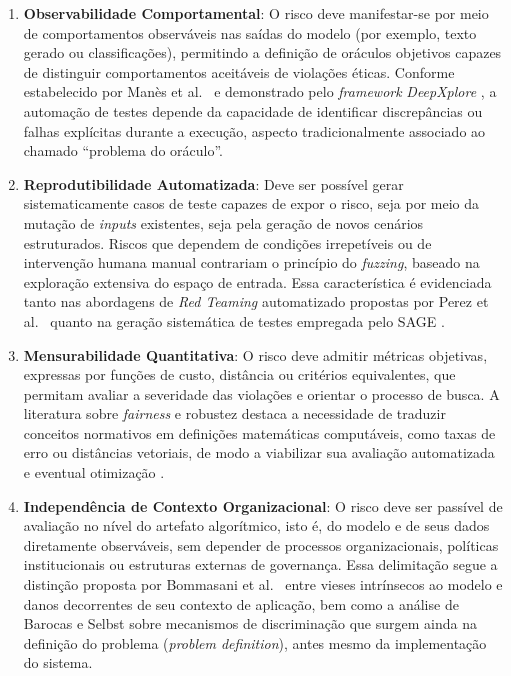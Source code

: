 \begin{enumerate}
    \item \textbf{Observabilidade Comportamental}: O risco deve manifestar-se por meio de comportamentos observáveis nas saídas do modelo (por exemplo, texto gerado ou classificações), permitindo a definição de oráculos objetivos capazes de distinguir comportamentos aceitáveis de violações éticas. Conforme estabelecido por Manès et al.~\cite{Manes2021} e demonstrado pelo \textit{framework} \textit{DeepXplore} \cite{Pei2017}, a automação de testes depende da capacidade de identificar discrepâncias ou falhas explícitas durante a execução, aspecto tradicionalmente associado ao chamado ``problema do oráculo''.

    \item \textbf{Reprodutibilidade Automatizada}: Deve ser possível gerar sistematicamente casos de teste capazes de expor o risco, seja por meio da mutação de \textit{inputs} existentes, seja pela geração de novos cenários estruturados. Riscos que dependem de condições irrepetíveis ou de intervenção humana manual contrariam o princípio do \textit{fuzzing}, baseado na exploração extensiva do espaço de entrada. Essa característica é evidenciada tanto nas abordagens de \textit{Red Teaming} automatizado propostas por Perez et al.~\cite{Perez2022} quanto na geração sistemática de testes empregada pelo SAGE \cite{Godefroid2008}.

    \item \textbf{Mensurabilidade Quantitativa}: O risco deve admitir métricas objetivas, expressas por funções de custo, distância ou critérios equivalentes, que permitam avaliar a severidade das violações e orientar o processo de busca. A literatura sobre \textit{fairness} e robustez destaca a necessidade de traduzir conceitos normativos em definições matemáticas computáveis, como taxas de erro ou distâncias vetoriais, de modo a viabilizar sua avaliação automatizada e eventual otimização \cite{Bellamy2019, Odena2019, Corbett-Davies2023}.

    \item \textbf{Independência de Contexto Organizacional}: O risco deve ser passível de avaliação no nível do artefato algorítmico, isto é, do modelo e de seus dados diretamente observáveis, sem depender de processos organizacionais, políticas institucionais ou estruturas externas de governança. Essa delimitação segue a distinção proposta por Bommasani et al.~\cite{Bommasani2022} entre vieses intrínsecos ao modelo e danos decorrentes de seu contexto de aplicação, bem como a análise de Barocas e Selbst \cite{Barocas2016} sobre mecanismos de discriminação que surgem ainda na definição do problema (\textit{problem definition}), antes mesmo da implementação do sistema.
\end{enumerate}

